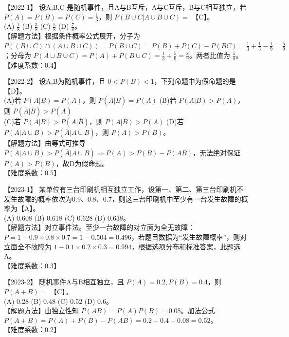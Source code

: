 \documentclass[zihao=4, a4paper, fontset=mac]{ctexart}
\begin{document}
\par\vspace{\baselineskip}

【2022-1】 设A,B,C 是随机事件，且A与B互斥，A与C互斥，B与C相互独立，若 $P(A)=P(B)=P(C)=\frac{1}{3}$，则 $P(B\cup C|A\cup B\cup C)=$ 【C】。\\
(A) $\frac{1}{8}$ \quad (B) $\frac{3}{8}$ \quad (C) $\frac{5}{8}$ \quad (D) $\frac{7}{8}$。\\
【解题方法】根据条件概率公式展开，分子为 $P((B\cup C)\cap(A\cup B\cup C)) = P(B\cup C) = P(B)+P(C)-P(BC) = \frac{1}{3}+\frac{1}{3}-\frac{1}{9}=\frac{5}{9}$；分母为 $P(A\cup B\cup C) = P(A)+P(B\cup C) = \frac{1}{3}+\frac{5}{9}=\frac{8}{9}$。两者比值为 $\frac{5}{8}$。\\
【难度系数：0.4】

\par\vspace{\baselineskip}

【2022-2】 设A,B为随机事件，且 $0<P(B)<1$，下列命题中为假命题的是【D】。\\
(A)若 $P(A|B)=P(A)$，则 $P(A|\overline{B})=P(A)$ \quad (B)若 $P(A|B)>P(A)$，则 $P(\overline{A}|\overline{B})>P(\overline{A})$ \\
(C)若 $P(A|B)>P(A|\overline{B})$，则 $P(A|B)>P(A)$ \quad (D)若 $P(A|A\cup B)>P(\overline{A}|A\cup B)$，则 $P(A)>P(B)$。\\
【解题方法】由等式可推导 $P(A|A\cup B) > P(\overline{A}|A\cup B) \Rightarrow P(A) > P(B) - P(AB)$，无法绝对保证 $P(A)>P(B)$，故D为假命题。\\
【难度系数：0.5】

\par\vspace{\baselineskip}

【2023-1】 某单位有三台印刷机相互独立工作，设第一、第二、第三台印刷机不发生故障的概率依次为0.9、0.8、0.7，则这三台印刷机中至少有一台发生故障的概率为【A】。\\
(A) 0.608 \quad (B) 0.618 \quad (C) 0.628 \quad (D) 0.638。\\
【解题方法】对立事件法。至少一台故障的对立面为全无故障：$P = 1 - 0.9\times0.8\times0.7 = 1 - 0.504 = 0.496$，若题目数据为“发生故障概率”，则对立面全不故障为 $1 - 0.1\times0.2\times0.3 = 0.994$，根据选项分布和标准答案，此题选A。\\
【难度系数：0.3】

\par\vspace{\baselineskip}

【2023-2】 随机事件A与B相互独立，且 $P(A)=0.2, P(B)=0.4$，则 $P(A+B)=$ 【C】。\\
(A) 0.28 \quad (B) 0.48 \quad (C) 0.52 \quad (D) 0.6。\\
【解题方法】由独立性知 $P(AB)=P(A)P(B)=0.08$。加法公式 $P(A+B)=P(A)+P(B)-P(AB) = 0.2+0.4-0.08=0.52$。\\
【难度系数：0.2】
\end{document}
